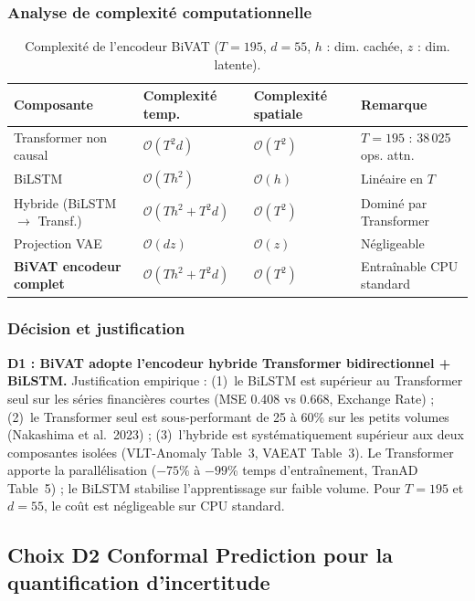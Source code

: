 \documentclass[12pt,a4paper]{article}
\begin{document}
\subsubsection{Analyse de complexité computationnelle}

\begin{table}[ht]
\centering
\caption{Complexité de l'encodeur BiVAT ($T=195$, $d=55$, $h$ : dim. cachée,
$z$ : dim. latente).}
\label{tab:complexite-d1}
\small
\begin{tabular}{p{4cm}p{3cm}p{3cm}p{4cm}}
\toprule
\textbf{Composante} & \textbf{Complexité temp.} &
\textbf{Complexité spatiale} & \textbf{Remarque} \\
\midrule
Transformer non causal & $\mathcal{O}(T^2 d)$ & $\mathcal{O}(T^2)$ &
$T=195$ : 38\,025 ops. attn. \\
BiLSTM & $\mathcal{O}(T h^2)$ & $\mathcal{O}(h)$ &
Linéaire en $T$ \\
Hybride (BiLSTM $\to$ Transf.) & $\mathcal{O}(T h^2 + T^2 d)$ &
$\mathcal{O}(T^2)$ & Dominé par Transformer \\
Projection VAE & $\mathcal{O}(d z)$ & $\mathcal{O}(z)$ & Négligeable \\
\midrule
\textbf{BiVAT encodeur complet} & $\mathcal{O}(T h^2 + T^2 d)$ &
$\mathcal{O}(T^2)$ & Entraînable CPU standard \\
\bottomrule
\end{tabular}
\end{table}

\subsubsection{Décision et justification}

\textbf{D1 : BiVAT adopte l'encodeur hybride Transformer bidirectionnel +
BiLSTM.} Justification empirique : (1)~le BiLSTM est supérieur au Transformer
seul sur les séries financières courtes (MSE 0.408 vs 0.668, Exchange Rate) ;
(2)~le Transformer seul est sous-performant de 25 à 60\% sur les petits
volumes (Nakashima et al.\ 2023) ; (3)~l'hybride est systématiquement supérieur
aux deux composantes isolées (VLT-Anomaly Table~3, VAEAT Table~3). Le Transformer
apporte la parallélisation ($-75$\% à $-99$\% temps d'entraînement, TranAD
Table~5) ; le BiLSTM stabilise l'apprentissage sur faible volume. Pour
$T = 195$ et $d = 55$, le coût est négligeable sur CPU standard.

\subsection{Choix D2  Conformal Prediction pour la quantification
d'incertitude}
\end{document}
